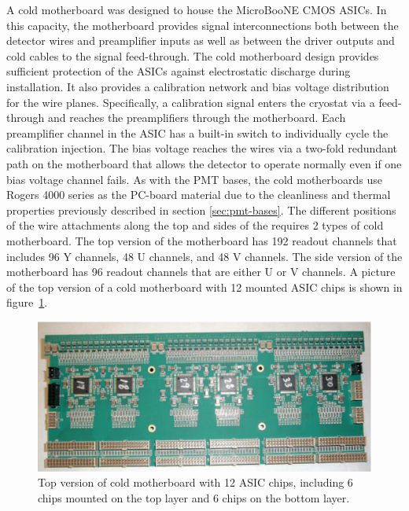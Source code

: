 A cold motherboard was designed to house the MicroBooNE CMOS ASICs. In this capacity, the motherboard provides signal interconnections both between the detector wires and preamplifier inputs as well as between the driver outputs and cold cables to the signal feed-through. The cold motherboard design provides sufficient protection of the ASICs against electrostatic discharge during installation. It also provides a calibration network and bias voltage distribution for the wire planes. Specifically, a calibration signal enters the cryostat via a feed-through and reaches the preamplifiers through the motherboard. Each preamplifier channel in the ASIC has a built-in switch to individually cycle the calibration injection. The bias voltage reaches the \lartpc wires via a two-fold redundant path on the motherboard that allows the detector to operate normally even if one bias voltage channel fails.  As with the PMT bases, the cold motherboards use Rogers 4000 series as the PC-board material due to the cleanliness and thermal properties previously described in section \ref{sec:pmt-bases}.  The different positions of the wire attachments along the top and sides of the \lartpc requires 2 types of cold motherboard. The top version of the motherboard has 192 readout channels that includes 96 Y channels, 48 U channels, and 48 V channels. The side version of the motherboard has 96 readout channels that are either U or V channels. A picture of the top version of a cold motherboard with 12 mounted ASIC chips is shown in figure~\ref{fig:figmb}. 

\begin{figure}
\centering
\includegraphics[width=0.75\linewidth]{figures/mb2.pdf}
\caption{\label{fig:figmb} Top version of cold motherboard with 12 ASIC chips, including 6 chips mounted on the top layer and 6 chips on the bottom layer.}
\end{figure}


